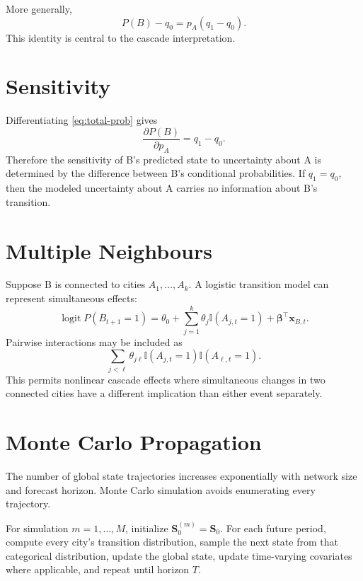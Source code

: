 \documentclass[11pt,letterpaper]{article}
\begin{document}
More generally,
\begin{equation}
P(B)-q_0=p_A(q_1-q_0).
\label{eq:cascade-identity}
\end{equation}
This identity is central to the cascade interpretation.

\section{Sensitivity}
Differentiating \cref{eq:total-prob} gives
\begin{equation}
\frac{\partial P(B)}{\partial p_A}=q_1-q_0.
\end{equation}
Therefore the sensitivity of B's predicted state to uncertainty about A is determined by the difference between B's conditional probabilities. If $q_1=q_0$, then the modeled uncertainty about A carries no information about B's transition.

\section{Multiple Neighbours}
Suppose B is connected to cities $A_1,\ldots,A_k$. A logistic transition model can represent simultaneous effects:
\begin{equation}
\operatorname{logit}P(B_{t+1}=1)=\theta_0+\sum_{j=1}^{k}\theta_j\mathbb{I}(A_{j,t}=1)+\boldsymbol{\beta}^{\top}\mathbf{x}_{B,t}.
\end{equation}
Pairwise interactions may be included as
\begin{equation}
\sum_{j<\ell}\theta_{j\ell}\mathbb{I}(A_{j,t}=1)\mathbb{I}(A_{\ell,t}=1).
\end{equation}
This permits nonlinear cascade effects where simultaneous changes in two connected cities have a different implication than either event separately.

\section{Monte Carlo Propagation}
The number of global state trajectories increases exponentially with network size and forecast horizon. Monte Carlo simulation avoids enumerating every trajectory.

For simulation $m=1,\ldots,M$, initialize $\mathbf{S}^{(m)}_0=\mathbf{S}_0$. For each future period, compute every city's transition distribution, sample the next state from that categorical distribution, update the global state, update time-varying covariates where applicable, and repeat until horizon $T$.
\end{document}
